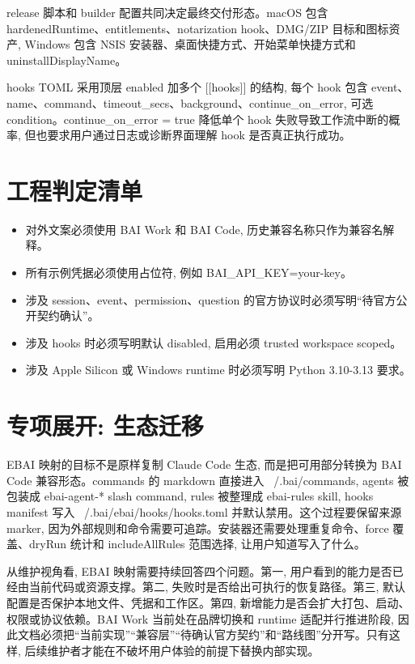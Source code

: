 release 脚本和 builder 配置共同决定最终交付形态。macOS 包含 hardenedRuntime、entitlements、notarization hook、DMG/ZIP 目标和图标资产, Windows 包含 NSIS 安装器、桌面快捷方式、开始菜单快捷方式和 uninstallDisplayName。

hooks TOML 采用顶层 enabled 加多个 [[hooks]] 的结构, 每个 hook 包含 event、name、command、timeout\_secs、background、continue\_on\_error, 可选 condition。continue\_on\_error = true 降低单个 hook 失败导致工作流中断的概率, 但也要求用户通过日志或诊断界面理解 hook 是否真正执行成功。

\section{工程判定清单}
\begin{itemize}
  \item 对外文案必须使用 BAI Work 和 BAI Code, 历史兼容名称只作为兼容名解释。
  \item 所有示例凭据必须使用占位符, 例如 BAI\_API\_KEY=your-key。
  \item 涉及 session、event、permission、question 的官方协议时必须写明“待官方公开契约确认”。
  \item 涉及 hooks 时必须写明默认 disabled, 启用必须 trusted workspace scoped。
  \item 涉及 Apple Silicon 或 Windows runtime 时必须写明 Python 3.10-3.13 要求。
\end{itemize}

\section{专项展开: 生态迁移}
EBAI 映射的目标不是原样复制 Claude Code 生态, 而是把可用部分转换为 BAI Code 兼容形态。commands 的 markdown 直接进入 ~/.bai/commands, agents 被包装成 ebai-agent-* slash command, rules 被整理成 ebai-rules skill, hooks manifest 写入 ~/.bai/ebai/hooks/hooks.toml 并默认禁用。这个过程要保留来源 marker, 因为外部规则和命令需要可追踪。安装器还需要处理重复命令、force 覆盖、dryRun 统计和 includeAllRules 范围选择, 让用户知道写入了什么。

从维护视角看, EBAI 映射需要持续回答四个问题。第一, 用户看到的能力是否已经由当前代码或资源支撑。第二, 失败时是否给出可执行的恢复路径。第三, 默认配置是否保护本地文件、凭据和工作区。第四, 新增能力是否会扩大打包、启动、权限或协议依赖。BAI Work 当前处在品牌切换和 runtime 适配并行推进阶段, 因此文档必须把“当前实现”“兼容层”“待确认官方契约”和“路线图”分开写。只有这样, 后续维护者才能在不破坏用户体验的前提下替换内部实现。

